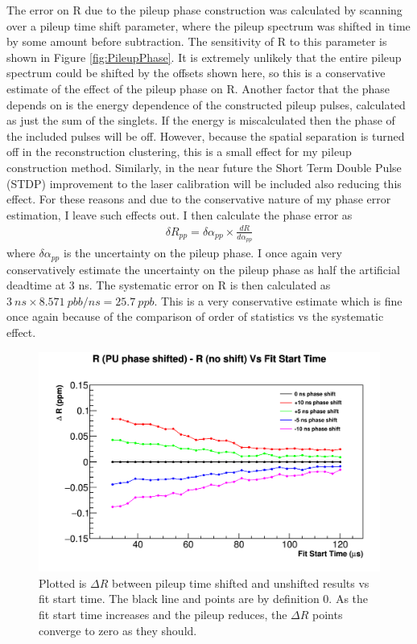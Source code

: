The error on R due to the pileup phase construction was calculated by scanning over a pileup time shift parameter, where the pileup spectrum was shifted in time by some amount before subtraction. The sensitivity of R to this parameter is shown in Figure \ref{fig:PileupPhase}. It is extremely unlikely that the entire pileup spectrum could be shifted by the offsets shown here, so this is a conservative estimate of the effect of the pileup phase on R. Another factor that the phase depends on is the energy dependence of the constructed pileup pulses, calculated as just the sum of the singlets. If the energy is miscalculated then the phase of the included pulses will be off. However, because the spatial separation is turned off in the reconstruction clustering, this is a small effect for my pileup construction method. Similarly, in the near future the Short Term Double Pulse (STDP) improvement to the laser calibration will be included also reducing this effect. For these reasons and due to the conservative nature of my phase error estimation, I leave such effects out. I then calculate the phase error as 
	\begin{align}
		\delta R_{pp} = \delta\alpha_{pp} \times \frac{dR}{d\alpha_{pp}}
	\end{align}
where $\delta\alpha_{pp}$ is the uncertainty on the pileup phase. I once again very conservatively estimate the uncertainty on the pileup phase as half the artificial deadtime at 3 ns. The systematic error on R is then calculated as $\SI{3}{ns} \times \SI{8.571}{pbb/ns} = \SI{25.7}{ppb}$. This is a very conservative estimate which is fine once again because of the comparison of order of statistics vs the systematic effect.

\begin{figure}[]
	\centering
	\includegraphics[width=.8\textwidth]{pileupTimeShiftComparison}
    \caption[PileupTimeShiftFS]{Plotted is $\Delta R$ between pileup time shifted and unshifted results vs fit start time. The black line and points are by definition 0. As the fit start time increases and the pileup reduces, the $\Delta R$ points converge to zero as they should.}
    \label{fig:PileupTimeShiftFS}
\end{figure}

